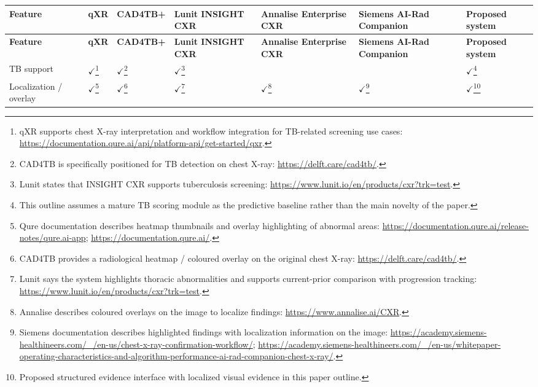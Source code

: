 \documentclass[11pt]{article}
\begin{document}
{\scriptsize
\begin{longtable}{p{} p{} p{} p{} p{} p{} p{}}
\toprule
\textbf{Feature} & \textbf{qXR} & \textbf{CAD4TB+} & \textbf{Lunit INSIGHT CXR} & \textbf{Annalise Enterprise CXR} & \textbf{Siemens AI-Rad Companion} & \textbf{Proposed system} \\
\midrule
\endfirsthead
\toprule
\textbf{Feature} & \textbf{qXR} & \textbf{CAD4TB+} & \textbf{Lunit INSIGHT CXR} & \textbf{Annalise Enterprise CXR} & \textbf{Siemens AI-Rad Companion} & \textbf{Proposed system} \\
\midrule
\endhead
TB support & $\checkmark$\footnote{qXR supports chest X-ray interpretation and workflow integration for TB-related screening use cases: \url{https://documentation.qure.ai/api/platform-api/get-started/qxr}.} & $\checkmark$\footnote{CAD4TB is specifically positioned for TB detection on chest X-ray: \url{https://delft.care/cad4tb/}.} & $\checkmark$\footnote{Lunit states that INSIGHT CXR supports tuberculosis screening: \url{https://www.lunit.io/en/products/cxr?trk=test}.} &  &  & $\checkmark$\footnote{This outline assumes a mature TB scoring module as the predictive baseline rather than the main novelty of the paper.} \\

Localization / overlay & $\checkmark$\footnote{Qure documentation describes heatmap thumbnails and overlay highlighting of abnormal areas: \url{https://documentation.qure.ai/release-notes/qure.ai-app}; \url{https://documentation.qure.ai/}.} & $\checkmark$\footnote{CAD4TB provides a radiological heatmap / coloured overlay on the original chest X-ray: \url{https://delft.care/cad4tb/}.} & $\checkmark$\footnote{Lunit says the system highlights thoracic abnormalities and supports current-prior comparison with progression tracking: \url{https://www.lunit.io/en/products/cxr?trk=test}.} & $\checkmark$\footnote{Annalise describes coloured overlays on the image to localize findings: \url{https://www.annalise.ai/CXR}.} & $\checkmark$\footnote{Siemens documentation describes highlighted findings with localization information on the image: \url{https://academy.siemens-healthineers.com/_/en-us/chest-x-ray-confirmation-workflow/}; \url{https://academy.siemens-healthineers.com/_/en-us/whitepaper-operating-characteristics-and-algorithm-performance-ai-rad-companion-chest-x-ray/}.} & $\checkmark$\footnote{Proposed structured evidence interface with localized visual evidence in this paper outline.} \\


\end{longtable}}
\end{document}

